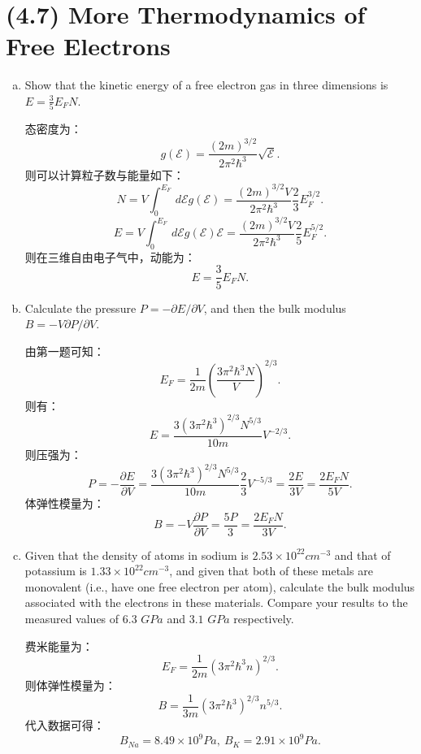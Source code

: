 \documentclass[reqno,a4paper,12pt]{amsart}
\begin{document}
\section{\textbf{(4.7) More Thermodynamics of Free Electrons}}
\begin{enumerate}[(a)]
	\item Show that the kinetic energy of a free electron gas in three dimensions is $E = \frac{3}{5}E_FN$.
	\begin{tcolorbox}[breakable, colback = black!5!white, colframe = black]
	态密度为：
	\[
		g(\mathcal{E}) = \frac{(2m)^{3/2}}{2\pi^2\hbar^3}\sqrt{\mathcal{E}}.
	\]
	则可以计算粒子数与能量如下：
	\[
		N = V\int_0^{E_F} \,d\mathcal{E}g(\mathcal{E}) = \frac{(2m)^{3/2}V}{2\pi^2\hbar^3} \frac{2}{3} E_F^{3/2}.
	\]
	\[
		E = V\int_0^{E_F} \,d\mathcal{E}g(\mathcal{E}) \mathcal{E} = \frac{(2m)^{3/2}V}{2\pi^2\hbar^3} \frac{2}{5} E_F^{5/2}.
	\]
	则在三维自由电子气中，动能为：
	\[
		E = \frac{3}{5}E_FN.
	\]
	\end{tcolorbox}
	
	\item Calculate the pressure $P = -\partial E/\partial V$, and then the bulk modulus $B = -V\partial P/\partial V$.
	\begin{tcolorbox}[breakable, colback = black!5!white, colframe = black]
	由第一题可知：
	\[
		E_F = \frac{1}{2m}\left( \frac{3\pi^2\hbar^3N}{V} \right)^{2/3}.
	\]
	则有：
	\[
		E = \frac{3(3\pi^2\hbar^3)^{2/3}N^{5/3}}{10m} V^{-2/3}.
	\]
	则压强为：
	\[
		P = -\frac{\partial E}{\partial V} = \frac{3(3\pi^2\hbar^3)^{2/3}N^{5/3}}{10m} \frac{2}{3} V^{-5/3} = \frac{2E}{3V} = \frac{2E_FN}{5V}.
	\]
	体弹性模量为：
	\[
		B = -V\frac{\partial P}{\partial V} = \frac{5P}{3} = \frac{2E_FN}{3V}.
	\]
	\end{tcolorbox}
	
	\item Given that the density of atoms in sodium is $2.53\times 10^{22}cm^{-3}$ and that of potassium is $1.33\times 10^{22}cm^{-3}$, and given that both of these metals are monovalent (i.e., have one free electron per atom), calculate the bulk modulus associated with the electrons in these materials. Compare your results to the measured values of $6.3$ $GPa$ and $3.1$ $GPa$ respectively.
	\begin{tcolorbox}[breakable, colback = black!5!white, colframe = black]
	费米能量为：
	\[
		E_F = \frac{1}{2m}(3\pi^2\hbar^3n)^{2/3}.
	\]
	则体弹性模量为：
	\[
		B = \frac{1}{3m}(3\pi^2\hbar^3)^{2/3}n^{5/3}.
	\]
	代入数据可得：
	\[
		B_{Na} = 8.49\times 10^{9}Pa, ~ B_{K} = 2.91 \times 10^{9} Pa.
	\]
	\end{tcolorbox}
\end{enumerate}
\end{document}
